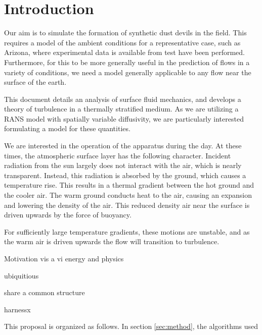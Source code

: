 \section{Introduction}

Our aim is to simulate the formation of synthetic dust devils in the field. This requires 
a model of the ambient conditions for a representative case, such as Arizona, where 
experimental data is available from test have been performed. Furthermore, for this to be 
more generally useful in the prediction of flows in a variety of conditions, we need a model 
generally applicable to any flow near the surface of the earth. 

This document details an analysis of surface fluid mechanics, and
develops a theory of turbulence in a thermally stratified medium. As we
are utilizing a RANS model with spatially variable diffusivity, we are
particularly interested formulating a model for these quantities. 

We are interested in the operation of the apparatus during the day. 
At these times, the atmospheric surface layer has the following character. 
Incident radiation from the sun largely does not interact with the
air, which is nearly transparent. Instead, this radiation is absorbed by
the ground, which causes a temperature rise. This results in a thermal
gradient between the hot ground and the cooler air. The warm ground
conducts heat to the air, causing an expansion and lowering the density
of the air. This reduced density air near the surface is driven upwards
by the force of buoyancy.  

For sufficiently large temperature gradients, these motions are
unstable, and as the warm air is driven upwards the flow will transition
to turbulence. 

Motivation vis a vi energy and physics

ubiquitious

share a common structure

harnessx

This proposal is organized as follows. In section \ref{sec:method},
the algorithms used 
